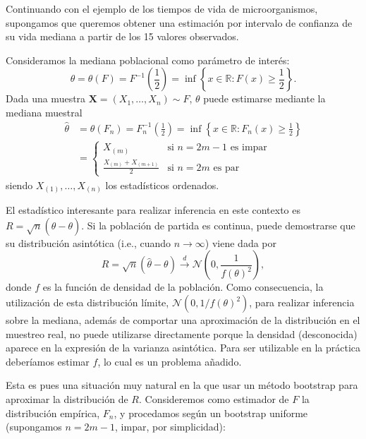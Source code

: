 \documentclass[]{book}
\theoremstyle{definition}
\theoremstyle{definition}
\theoremstyle{definition}
\theoremstyle{remark}
\let\BeginKnitrBlock\begin \let\EndKnitrBlock\end
\begin{document}
\BeginKnitrBlock{example}[Inferencia sobre la mediana]
\protect\hypertarget{exm:mediana}{}{\label{exm:mediana} {} } \vspace{0.5cm}

Continuando con el ejemplo de los tiempos de vida de microorganismos,
supongamos que queremos obtener una estimación por intervalo de
confianza de su vida mediana a partir de los 15 valores observados.
\EndKnitrBlock{example}

Consideramos la mediana poblacional como parámetro de interés:
\[\theta = \theta \left( F \right) = F^{-1}\left( \frac{1}{2} \right) 
= \inf \left\{ x\in \mathbb{R} : F\left( x \right) \geq \frac{1}{2}\right\}.\]
Dada una muestra \(\mathbf{X}=\left( X_1,\ldots ,X_n \right) \sim F\),
\(\theta\) puede estimarse mediante la mediana muestral
\[\begin{aligned}
\hat{\theta} &= \theta \left( F_n \right) =F_n^{-1}\left( \frac{1}{2} \right) 
=\inf \left\{ x\in \mathbb{R} : F_n\left( x \right) \geq \frac{1}{2}
\right\} \\
&= \left\{ 
\begin{array}{ll}
X_{(m)} & \text{si } n=2m-1 \text{ es impar} \\ 
\frac{X_{(m)}+X_{\left( m+1 \right)}}{2} & \text{si } n=2m \text{ es par}
\end{array}
\right.
\end{aligned}\] siendo \(X_{(1)},\ldots ,X_{(n)}\) los estadísticos
ordenados.

El estadístico interesante para realizar inferencia en este contexto es
\(R=\sqrt{n}\left( \hat{\theta}-\theta \right)\). Si la población de
partida es continua, puede demostrarse que su distribución asintótica
(i.e., cuando \(n \rightarrow \infty\)) viene dada por
\[R=\sqrt{n}\left( \hat{\theta}-\theta \right) \overset{d}{\rightarrow }
\mathcal{N}\left( 0,\frac{1}{f\left( \theta \right)^2} \right),\]donde
\(f\) es la función de densidad de la población. Como consecuencia, la
utilización de esta distribución límite,
\(\mathcal{N}\left( 0, 1/f\left( \theta \right)^2 \right)\), para
realizar inferencia sobre la mediana, además de comportar una
aproximación de la distribución en el muestreo real, no puede utilizarse
directamente porque la densidad (desconocida) aparece en la expresión de
la varianza asintótica. Para ser utilizable en la práctica deberíamos
estimar \(f\), lo cual es un problema añadido.

Esta es pues una situación muy natural en la que usar un método
bootstrap para aproximar la distribución de \(R\). Consideremos como
estimador de \(F\) la distribución empírica, \(F_n\), y procedamos según
un bootstrap uniforme (supongamos \(n=2m-1\), impar, por simplicidad):
\end{document}
